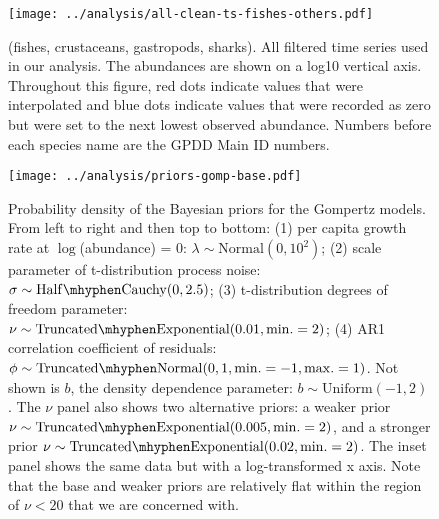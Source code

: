 \begin{figure}[htbp]
\begin{center}
\texttt{[image: ../analysis/all-clean-ts-fishes-others.pdf]}

\caption[All filtered time series used in our analysis.]{(fishes, crustaceans,
  gastropods, sharks). All filtered time series used in our analysis. The
  abundances are shown on a log10 vertical axis. Throughout this figure, red
  dots indicate values that were interpolated and blue dots indicate values
  that were recorded as zero but were set to the next lowest observed
  abundance. Numbers before each species name are the GPDD Main ID numbers.}

\label{fig:all-ts}
\end{center}
\end{figure}

\clearpage

\begin{figure}[htbp]
\begin{center}
\texttt{[image: ../analysis/priors-gomp-base.pdf]}

\caption[Probability density of the Bayesian priors for the Gompertz models.]{
  Probability density of the Bayesian priors for the Gompertz models. From
  left to right and then top to bottom: (1) per capita growth rate at
  $\log$(abundance) = $0$: $\lambda \sim \mathrm{Normal}(0, 10^2)$; (2) scale
  parameter of t-distribution process noise: $\sigma \sim \mathrm{Half\mhyphen
    Cauchy} (0, 2.5)$; (3) t-distribution degrees of freedom parameter: $\nu
  \sim \mathrm{Truncated\mhyphen Exponential}(0.01, \mathrm{min.} = 2)$; (4)
  AR1 correlation coefficient of residuals: $\phi \sim \mathrm{Truncated
    \mhyphen Normal}(0, 1, \mathrm{min.} = -1, \mathrm{max.} = 1)$. Not shown
  is $b$, the density dependence parameter: $b \sim \mathrm{Uniform}(-1, 2)$.
  The $\nu$ panel also shows two alternative priors: a weaker prior $\nu \sim
  \mathrm{Truncated\mhyphen Exponential}(0.005, \mathrm{min.} = 2)$, and a
  stronger prior $\nu \sim \mathrm{Truncated\mhyphen Exponential}(0.02,
  \mathrm{min.} = 2)$. The inset panel shows the same data but with a
  log-transformed x axis. Note that the base and weaker priors are relatively
  flat within the region of $\nu < 20$ that we are concerned with. }

\label{fig:priors}
\end{center}
\end{figure}

\clearpage

